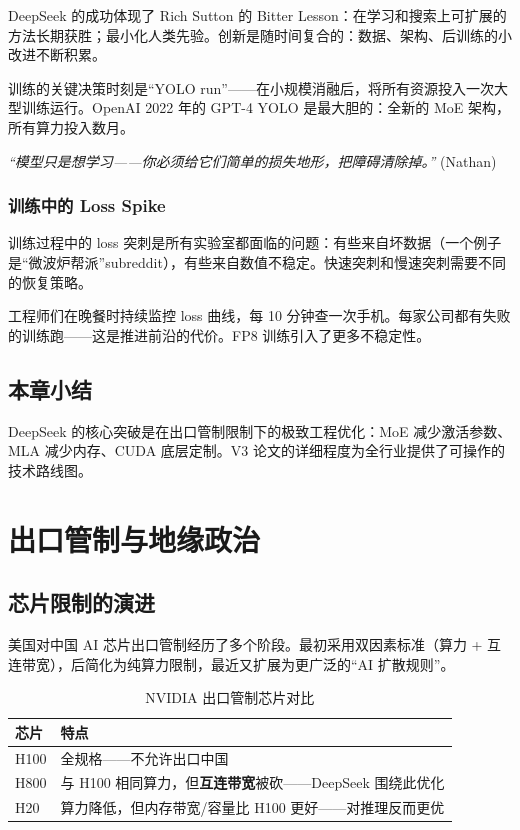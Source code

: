 \documentclass[a4paper]{article}
\begin{document}
DeepSeek 的成功体现了 Rich Sutton 的 Bitter Lesson：在学习和搜索上可扩展的方法长期获胜；最小化人类先验。创新是随时间复合的：数据、架构、后训练的小改进不断积累。

训练的关键决策时刻是``YOLO run''——在小规模消融后，将所有资源投入一次大型训练运行。OpenAI 2022 年的 GPT-4 YOLO 是最大胆的：全新的 MoE 架构，所有算力投入数月。

\textit{``模型只是想学习——你必须给它们简单的损失地形，把障碍清除掉。''} (Nathan)

\subsubsection{训练中的 Loss Spike}

训练过程中的 loss 突刺是所有实验室都面临的问题：有些来自坏数据（一个例子是``微波炉帮派''subreddit），有些来自数值不稳定。快速突刺和慢速突刺需要不同的恢复策略。

工程师们在晚餐时持续监控 loss 曲线，每 10 分钟查一次手机。每家公司都有失败的训练跑——这是推进前沿的代价。FP8 训练引入了更多不稳定性。

\subsection{本章小结}

DeepSeek 的核心突破是在出口管制限制下的极致工程优化：MoE 减少激活参数、MLA 减少内存、CUDA 底层定制。V3 论文的详细程度为全行业提供了可操作的技术路线图。

\section{出口管制与地缘政治}

\subsection{芯片限制的演进}

美国对中国 AI 芯片出口管制经历了多个阶段。最初采用双因素标准（算力 + 互连带宽），后简化为纯算力限制，最近又扩展为更广泛的``AI 扩散规则''。

\begin{table}[H]
\centering
\begin{tabular}{lp{8cm}}
\toprule
\textbf{芯片} & \textbf{特点} \\
\midrule
H100 & 全规格——不允许出口中国 \\
H800 & 与 H100 相同算力，但\textbf{互连带宽}被砍——DeepSeek 围绕此优化 \\
H20 & 算力降低，但内存带宽/容量比 H100 更好——对推理反而更优 \\
\bottomrule
\end{tabular}
\caption{NVIDIA 出口管制芯片对比}
\end{table}
\end{document}
